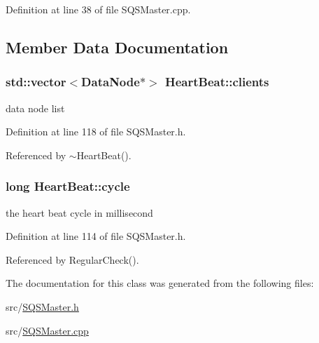 \-Definition at line 38 of file \-S\-Q\-S\-Master.\-cpp.



\subsection{\-Member \-Data \-Documentation}
\hypertarget{classHeartBeat_a6a52caa433708eae3b8dfd315c7f3f70}{
\subsubsection[{clients}]{\setlength{\rightskip}{0pt plus 5cm}std\-::vector$<${\bf \-Data\-Node}$\ast$$>$ {\bf \-Heart\-Beat\-::clients}}}\label{d7/d28/classHeartBeat_a6a52caa433708eae3b8dfd315c7f3f70}


data node list 



\-Definition at line 118 of file \-S\-Q\-S\-Master.\-h.



\-Referenced by $\sim$\-Heart\-Beat().

\hypertarget{classHeartBeat_aa0384e810d6db72a57bea95a74a262db}{
\subsubsection[{cycle}]{\setlength{\rightskip}{0pt plus 5cm}long {\bf \-Heart\-Beat\-::cycle}}}\label{d7/d28/classHeartBeat_aa0384e810d6db72a57bea95a74a262db}


the heart beat cycle in millisecond 



\-Definition at line 114 of file \-S\-Q\-S\-Master.\-h.



\-Referenced by \-Regular\-Check().



\-The documentation for this class was generated from the following files\-:\begin{DoxyCompactItemize}
\item 
src/\hyperlink{SQSMaster_8h}{\-S\-Q\-S\-Master.\-h}\item 
src/\hyperlink{SQSMaster_8cpp}{\-S\-Q\-S\-Master.\-cpp}\end{DoxyCompactItemize}
